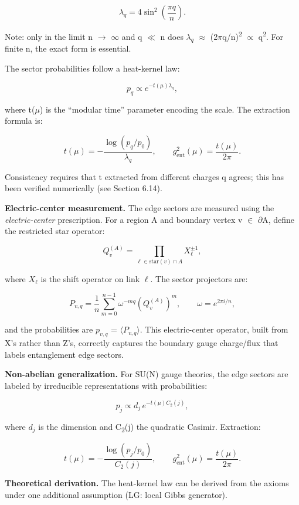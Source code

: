 \documentclass[11pt,a4paper]{article}
\theoremstyle{remark}
\begin{document}
\[
\lambda_q = 4 \sin^2\left(\frac{\pi q}{n}\right).
\]

Note: only in the limit n \ensuremath{\to} \ensuremath{\infty} and q \ensuremath{\ll} n does \(\ensuremath{\lambda}_q\) \ensuremath{\approx}
(2\ensuremath{\pi}q/n)\textsuperscript{2} \ensuremath{\propto} q\textsuperscript{2}. For finite n, the exact form is essential.

The sector probabilities follow a heat-kernel law:

\[
p_q \propto e^{-t(\mu) \lambda_q},
\]

where t(\ensuremath{\mu}) is the ``modular time'' parameter encoding the scale. The
extraction formula is:

\[
t(\mu) = -\frac{\log(p_q/p_0)}{\lambda_q}, \qquad
g_{\mathrm{ent}}^2(\mu) = \frac{t(\mu)}{2\pi}.
\]

Consistency requires that t extracted from different charges q agrees;
this has been verified numerically (see Section 6.14).

\textbf{Electric-center measurement.} The edge sectors are measured using the
\emph{electric-center} prescription. For a region A and boundary vertex
v \ensuremath{\in} \ensuremath{\partial}A, define the restricted star operator:

\[
Q_v^{(A)} = \prod_{\ell \in \mathrm{star}(v) \cap A} X_\ell^{\pm 1},
\]

where \(X_\ensuremath{\ell}\) is the shift operator on link \ensuremath{\ell}. The sector projectors are:

\[
P_{v,q} = \frac{1}{n} \sum_{m=0}^{n-1} \omega^{-mq} \left(Q_v^{(A)}\right)^m,
\qquad \omega = e^{2\pi i/n},
\]

and the probabilities are \(p_{v,q}\) = \ensuremath{\langle}\(P_{v,q}\)\ensuremath{\rangle}. This
electric-center operator, built from X's rather than Z's, correctly
captures the boundary gauge charge/flux that labels entanglement edge sectors.

\textbf{Non-abelian generalization.} For SU(N) gauge theories, the edge
sectors are labeled by irreducible representations with probabilities:

\[
p_j \propto d_j \, e^{-t(\mu) C_2(j)},
\]

where \(d_j\) is the dimension and C\textsubscript{2}(j) the quadratic Casimir. Extraction:

\[
t(\mu) = -\frac{\log(p_j/p_0)}{C_2(j)}, \qquad
g_{\mathrm{ent}}^2(\mu) = \frac{t(\mu)}{2\pi}.
\]

\textbf{Theoretical derivation.} The heat-kernel law can be derived from the axioms
under one additional assumption (LG: local Gibbs generator).
\end{document}
